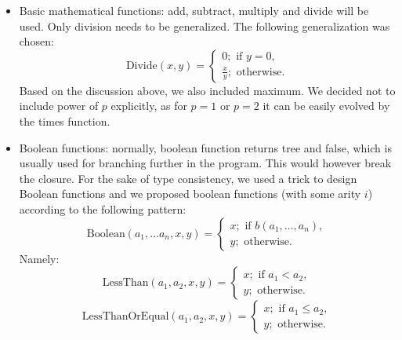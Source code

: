  \begin{itemize}
 	\item Basic mathematical functions: add, subtract, multiply and divide will be used. Only division needs to be generalized. The following generalization was chosen:
 	\begin{equation*}
 	\text{Divide}(x,y)=
 	\begin{cases}
 	0; \text{ if } y = 0, \\
 	\frac{x}{y}; \text{ otherwise}.
 	\end{cases}
 	\end{equation*}
 	Based on the discussion above, we also included maximum. We decided not to include power of $p$ explicitly, as for $p=1$ or $p=2$ it can be easily evolved by the times function.
 	\item Boolean functions: normally, boolean function returns tree and false, which is usually used for branching further in the program. This would however break the closure. For the sake of type consistency, we used a trick to design Boolean functions and we proposed boolean functions (with some arity $i$) according to the following pattern:
 	\begin{equation*}
 	\text{Boolean}(a_1, \dots a_n,x,y)=
 	\begin{cases}
 	x; \text{ if } b(a_1, \dots, a_n), \\
 	y; \text{ otherwise}.
 	\end{cases}
 	\end{equation*}
 	Namely:
 	\begin{equation*}
 	\text{LessThan}(a_1,a_2,x,y)=
 	\begin{cases}
 	x; \text{ if } a_1 < a_2, \\
 	y; \text{ otherwise}.
 	\end{cases}
 	\end{equation*}
 	\begin{equation*}
 	\text{LessThanOrEqual}(a_1,a_2,x,y)=
 	\begin{cases}
 	x; \text{ if } a_1 \le a_2, \\
 	y; \text{ otherwise}.
 	\end{cases}
 	\end{equation*}
 	

\end{itemize}
